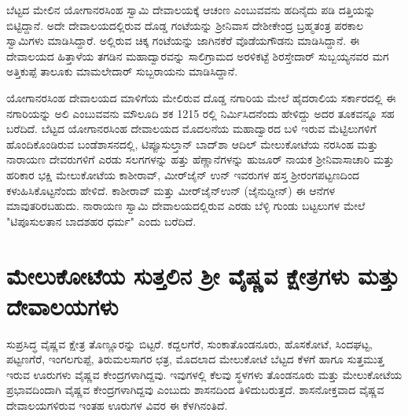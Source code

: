 ಬೆಟ್ಟದ ಮೇಲಿನ ಯೋಗಾನರಸಿಂಹ ಸ್ವಾಮಿ ದೇವಾಲಯಕ್ಕೆ ಆಚಂಣ ಎಂಬುವವನು ಹದಿನೈದು ಪಡಿ ದತ್ತಿಯನ್ನು ಬಿಟ್ಟಿದ್ದಾನೆ. ಅದೇ ದೇವಾಲಯದಲ್ಲಿರುವ ದೊಡ್ಡ ಗಂಟೆಯನ್ನು ಶ‍್ರೀನಿವಾಸ ದೇಶೀಕೇಂದ್ರ ಬ್ರಹ್ಮತಂತ್ರ ಪರಕಾಲ ಸ್ವಾಮಿಗಳು ಮಾಡಿಸಿದ್ದಾರೆ. ಅಲ್ಲಿರುವ ಚಿಕ್ಕ ಗಂಟೆಯನ್ನು ಜಾಗಿನಕೆರೆ ವೊಡೆಯಗೌಡನು ಮಾಡಿಸಿದ್ದಾನೆ. ಈ ದೇವಾಲಯದ ಹಿತ್ತಾಳೆಯ ತಗಡಿನ ಮಹಾದ್ವಾರವನ್ನು ಸಾಲಿಗ್ರಾಮದ ಅರಳಿಕಟ್ಟೆ ಶಿರಸ್ತೇದಾರ್​ ಸುಬ್ಬಯ್ಯನವರ ಮಗ ಅತ್ತಿಕುಪ್ಪೆ ತಾಲೂಕು ಮಾಮಲೇದಾರ್​ ಸುಬ್ಬರಾಯನು ಮಾಡಿಸಿದ್ದಾನೆ.

ಯೋಗಾನರಸಿಂಹ ದೇವಾಲಯದ ಮಾಳಿಗೆಯ ಮೇಲಿರುವ ದೊಡ್ಡ ನಗಾರಿಯ ಮೇಲೆ ಹೈದರಾಲಿಯ ಸರ್ಕಾರದಲ್ಲಿ ಈ ನಗಾರಿಯನ್ನು ಅಲಿ ಎಂಬುವವನು ಮೌಲೂದಿ ಶಕ 1215 ರಲ್ಲಿ ನಿರ್ಮಿಸಿದನೆಂದು ಹೇಳಿದ್ದು ಅದರ ತೂಕವನ್ನೂ ಸಹ ಬರೆದಿದೆ. ಬೆಟ್ಟದ ಯೋಗಾನರಸಿಂಹ ದೇವಾಲಯದ ಮೊದಲನೆಯ ಮಹಾದ್ವಾರದ ಬಳಿ ಇರುವ ಮೆಟ್ಟಿಲುಗಳಿಗೆ ಹೊಂದಿಕೊಂಡಿರುವ ಬಂಡೆಶಾಸನದಲ್ಲಿ, ಟಿಪ್ಪೂಸುಲ್ತಾನ್​ ಬಾದ್​ಶಾ ಆದಿಲ್​ ಮೇಲುಕೋಟೆಯ ನರಸಿಂಹ ಮತ್ತು ನಾರಾಯಣ ದೇವರುಗಳಿಗೆ ಎರಡು ಸಲಗಗಳನ್ನು ಹತ್ತು ಹೆಣ್ಣಾನೆಗಳನ್ನು ಹುಜೂರ್​ ನಾಯಕ ಶ‍್ರೀನಿವಾಸಾಚಾರಿ ಮತ್ತು ಹರಿಕಾರ ಭಕ್ಷಿ ಮೇಲುಕೋಟೆಯ ಕಾಶೀರಾವ್​, ಮೀರ್​ಜೈನ್​ ಉನ್​ ಇವರುಗಳ ಹಸ್ತ ಶ‍್ರೀರಂಗಪಟ್ಟಣದಿಂದ ಕಳುಹಿಸಿಕೊಟ್ಟನೆಂದು ಹೇಳಿದೆ. ಕಾಶೀರಾವ್​ ಮತ್ತು ಮೀರ್​ಜೈನ್​ಉನ್​ (ಜೈನುದ್ದೀನ್​) ಈ ಆನೆಗಳ ಮಾವುತರಿರಬಹುದು. ನಾರಾಯಣ ಸ್ವಾಮಿ ದೇವಾಲಯದಲ್ಲಿರುವ ಎರಡು ಬೆಳ್ಳಿ ಗುಂಡು ಬಟ್ಟಲುಗಳ ಮೇಲೆ "ಟಿಪೂಸುಲತಾನ ಬಾದಶಹರ ಧರ್ಮ" ಎಂದು ಬರೆದಿದೆ.

\section*{ಮೇಲುಕೋಟೆಯ ಸುತ್ತಲಿನ ಶ‍್ರೀ ವೈಷ್ಣವ ಕ್ಷೇತ್ರಗಳು ಮತ್ತು ದೇವಾಲಯಗಳು}

ಸುಪ್ರಸಿದ್ಧ ವೈಷ್ಣವ ಕ್ಷೇತ್ರ ತೊಣ್ಣೂರನ್ನು ಬಿಟ್ಟರೆ. ಕದ್ದಲಗೆರೆ, ಸುಂಕಾತೊಂಡನೂರು, ಹೊಸಕೋಟೆ, ಸಿಂದಘಟ್ಟ, ಪಟ್ಟಣಗೆರೆ, ಇಂಗಲಗುಪ್ಪೆ, ತಿರುಮಲಸಾಗರ ಛತ್ರ, ಮೊದಲಾದ ಮೇಲುಕೋಟೆ ಬೆಟ್ಟದ ಕೆಳಗೆ ಹಾಗೂ ಸುತ್ತಮುತ್ತ ಇರುವ ಊರುಗಳು ವೈಷ್ಣವ ಕೇಂದ್ರಗಳಾಗಿದ್ದವು. ಇವುಗಳಲ್ಲಿ ಕೆಲವು ಸ್ಥಳಗಳು ತೊಂಡನೂರು ಮತ್ತು ಮೇಲುಕೋಟೆಯ ಪ್ರಭಾವದಿಂದಾಗಿ ವೈಷ್ಣವ ಕೇಂದ್ರಗಳಾಗಿದ್ದವು ಎಂಬುದು ಶಾಸನದಿಂದ ತಿಳಿದುಬರುತ್ತದೆ. ಶಾಸನೋಕ್ತವಾದ ವೈಷ್ಣವ ದೇವಾಲಯಗಳಿರುವ ಇಂತಹ ಊರುಗಳ ವಿವರ ಈ ಕೆಳಗಿನಂತಿದೆ.

